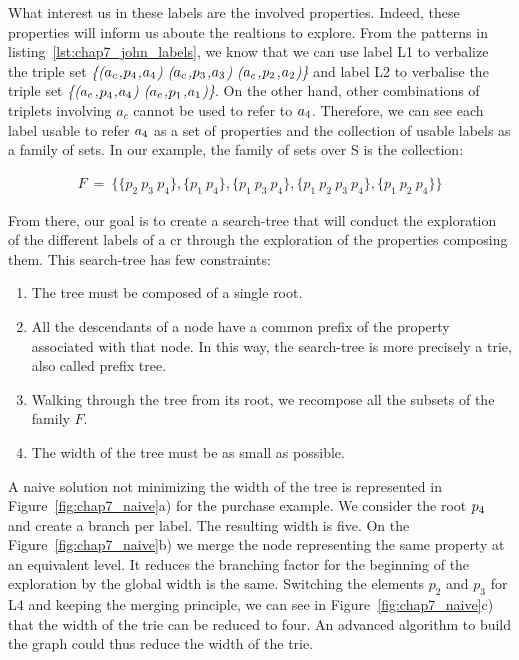 What interest us in these labels are the involved properties. Indeed, these properties will inform us aboute the realtions to explore. From the patterns in listing~\ref{lst:chap7_john_labels}, we know that we can use label L1 to verbalize the triple set \textit{\{($a_c$,$p_4$,$a_4$) ($a_c$,$p_3$,$a_3$) ($a_c$,$p_2$,$a_2$)\}} and label L2 to verbalise the triple set \textit{\{($a_c$,$p_4$,$a_4$) ($a_c$,$p_1$,$a_1$)\}}. On the other hand, other combinations of triplets involving $a_c$ cannot be used to refer to $a_4$. Therefore, we can see each label usable to refer $a_4$ as a set of properties and the collection of usable labels as a family of sets. In our example, the family of sets over S is the collection:

\begin{align*}
 F\ =\ \{\{p_2\ p_3\ p_4\},
\{p_1\ p_4\},
\{p_1\ p_3\ p_4\},
\{p_1\ p_2\ p_3\ p_4\},
\{p_1\ p_2\ p_4\}\}
\end{align*}

From there, our goal is to create a search-tree that will conduct the exploration of the different labels of a \acrshort{cr} through the exploration of the properties composing them. This search-tree has few constraints:
\begin{enumerate}
	\item The tree must be composed of a single root.
	\item All the descendants of a node have a common prefix of the property associated with that node. In this way, the search-tree is more precisely a trie, also called prefix tree.
	\item Walking through the tree from its root, we recompose all the subsets of the family $F$.
	\item The width of the tree must be as small as possible.
\end{enumerate}

A naive solution not minimizing the width of the tree is represented in Figure~\ref{fig:chap7_naive}a) for the purchase example. We consider the root $p_4$ and create a branch per label. The resulting width is five. On the Figure~\ref{fig:chap7_naive}b) we merge the node representing the same property at an equivalent level. It reduces the branching factor for the beginning of the exploration by the global width is the same. Switching the elements $p_2$ and $p_3$ for L4 and keeping the merging principle, we can see in Figure~\ref{fig:chap7_naive}c) that the width of the trie can be reduced to four. An advanced algorithm to build the graph could thus reduce the width of the trie.

